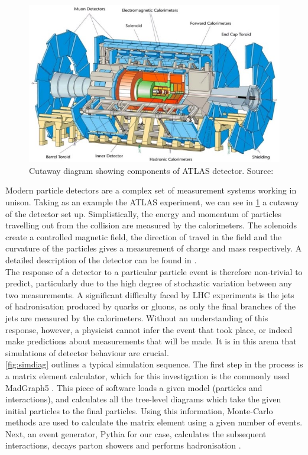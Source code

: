 \documentclass{report}
\begin{document}
\begin{figure}[H]
	\centering
	\includegraphics[width=0.8\linewidth]{atlasdetector}
	
	\caption{Cutaway diagram showing components of ATLAS detector. Source: \cite{atlaspic}}
	\label{fig:atlaspic}
	
\end{figure}


Modern particle detectors are a complex set of measurement systems working in unison. Taking as an example the ATLAS experiment, we can see in \cref{fig:atlaspic} a cutaway of the detector set up. Simplistically, the energy and momentum of particles travelling out from the collision are measured by the calorimeters. The solenoids create a controlled magnetic field, the direction of travel in the field and the curvature of the particles gives a measurement of charge and mass respectively. A detailed description of the detector can be found in \cite{armstrong}.
\\


The response of a detector to a particular particle event is therefore non-trivial to predict, particularly due to the high degree of stochastic variation between any two measurements. A significant difficulty faced by LHC experiments is the jets of hadronisation produced by quarks or gluons, as only the final branches of the jets are measured by the calorimeters. Without an understanding of this response, however, a physicist cannot infer the event that took place, or indeed make predictions about measurements that will be made. It is in this arena that simulations of detector behaviour are crucial. \\

\cref{fig:simdiag} outlines a typical simulation sequence. The first step in the process is a matrix element calculator, which for this investigation is the commonly used MadGraph5 \cite{madgraph}. This piece of software loads a given model (particles and interactions), and calculates all the tree-level diagrams which take the given initial particles to the final particles. Using this information, Monte-Carlo methods are used to calculate the matrix element using a given number of events. Next, an event generator, Pythia for our case, calculates the subsequent interactions, decays parton showers and performs hadronisation \cite{Gieseke2012}.\\
\end{document}
